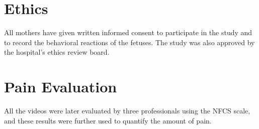 \section{Ethics}

All mothers have given written informed consent to participate in the study and to record the behavioral reactions of the fetuses. The study was also approved by the hospital's ethics review board.

\section{Pain Evaluation}

All the videos were later evaluated by three professionals using the NFCS scale, and these results were further used to quantify the amount of pain. 
